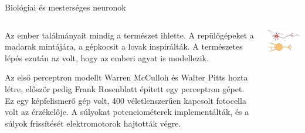 \documentclass[english, aspectratio=169]{beamer}
\begin{document}
\begin{frame}{Biológiai és mesterséges neuronok}
	\begin{columns}
		\begin{column}{.5\textwidth}
			Az ember találmányait mindig a természet ihlette. A repülőgépeket a madarak mintájára, a gépkocsit a lovak inspirálták. A természetes lépés ezután az volt, hogy az emberi agyat is modellezik.\par\medskip
			Az első perceptron modellt Warren McCulloh és Walter Pitts hozta létre, először pedig Frank Rosenblatt épített egy perceptron gépet. Ez egy képfelismerő gép volt, 400 véletlenszerűen kapcsolt fotocella volt az érzékelője. A súlyokat potenciométerek implementálták, és a súlyok frissítését elektromotorok hajtották végre. 
		\end{column}
		\begin{column}{.5\textwidth}
			\begin{center}
				\includegraphics[width=7cm, keepaspectratio]{images/dl_1.png}
			\end{center}
		\end{column}
	\end{columns}
\end{frame}
\end{document}
